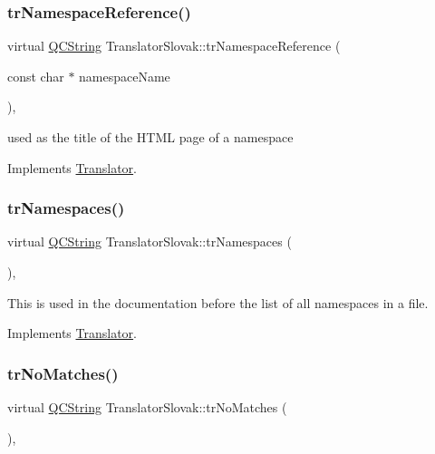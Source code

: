 \subsubsection{\texorpdfstring{trNamespaceReference()}{trNamespaceReference()}}
{\footnotesize\ttfamily virtual \mbox{\hyperlink{class_q_c_string}{Q\+C\+String}} Translator\+Slovak\+::tr\+Namespace\+Reference (\begin{DoxyParamCaption}\item[{const char $\ast$}]{namespace\+Name }\end{DoxyParamCaption})\hspace{0.3cm}{\ttfamily [inline]}, {\ttfamily [virtual]}}

used as the title of the H\+T\+ML page of a namespace 

Implements \mbox{\hyperlink{class_translator}{Translator}}.

\mbox{\label{class_translator_slovak_a78f06bc7433a1ce0aa3645dacffaa04a}} 
\subsubsection{\texorpdfstring{trNamespaces()}{trNamespaces()}}
{\footnotesize\ttfamily virtual \mbox{\hyperlink{class_q_c_string}{Q\+C\+String}} Translator\+Slovak\+::tr\+Namespaces (\begin{DoxyParamCaption}{ }\end{DoxyParamCaption})\hspace{0.3cm}{\ttfamily [inline]}, {\ttfamily [virtual]}}

This is used in the documentation before the list of all namespaces in a file. 

Implements \mbox{\hyperlink{class_translator}{Translator}}.

\mbox{\label{class_translator_slovak_a6f16b4517d6d9acb26da28582bc5a2eb}} 
\subsubsection{\texorpdfstring{trNoMatches()}{trNoMatches()}}
{\footnotesize\ttfamily virtual \mbox{\hyperlink{class_q_c_string}{Q\+C\+String}} Translator\+Slovak\+::tr\+No\+Matches (\begin{DoxyParamCaption}{ }\end{DoxyParamCaption})\hspace{0.3cm}{\ttfamily [inline]}, {\ttfamily [virtual]}}


